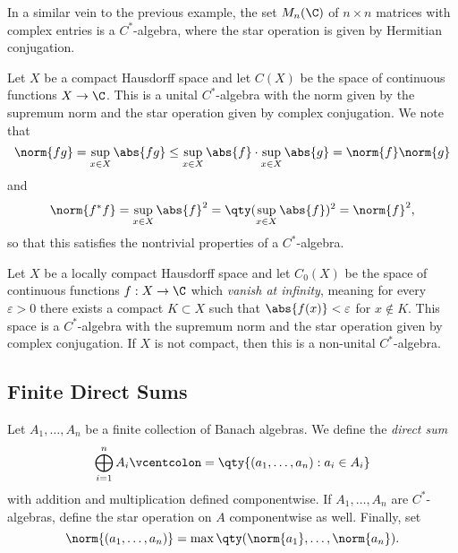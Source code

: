 \begin{example}
In a similar vein to the previous example, the set $M_{n}(\C)$ of $n \times n$ matrices with complex entries is a $C^*$-algebra, where the star operation is given by Hermitian conjugation.
\end{example}

\begin{example}
Let $X$ be a compact Hausdorff space and let $C(X)$ be the space of continuous functions $X \rightarrow \C$. This is a unital $C^*$-algebra with the norm given by the supremum norm and the star operation given by complex conjugation. We note that
\begin{equation}
\norm{fg} = \sup_{x \in X} \abs{fg} \leq \sup_{x \in X} \abs{f} \cdot \sup_{x \in X} \abs{g} = \norm{f} \norm{g}
\end{equation}
and 
\begin{equation}
\norm{f^*f} = \sup_{x \in X} \abs{f}^2  = \qty(\sup_{x \in X} \abs{f})^2 = \norm{f}^2,
\end{equation}
so that this satisfies the nontrivial properties of a $C^*$-algebra.
\end{example}


\begin{example}
Let $X$ be a locally compact Hausdorff space and let $C_0(X)$ be the space of continuous functions $f: X \rightarrow \C$ which \emph{vanish at infinity}, meaning for every $\varepsilon > 0$ there exists a compact $K \subset X$ such that $\abs{f(x)} < \varepsilon$ for $x \notin K$. This space is a $C^*$-algebra with the supremum norm and the star operation given by complex conjugation. If $X$ is not compact, then this is a non-unital $C^*$-algebra.
\end{example}


\subsection*{Finite Direct Sums}

Let $A_1,\ldots, A_n$ be a finite collection of Banach algebras. We define the \emph{direct sum}
\begin{equation}
\bigoplus_{i=1}^n A_i \defeq \qty{(a_1,\ldots, a_n): a_i \in A_i}
\end{equation}
with addition and multiplication defined componentwise. If $A_1,\ldots, A_n$ are $C^*$-algebras, define the star operation on $A$ componentwise as well. Finally, set
\begin{equation}
\norm{(a_1,\ldots, a_n)} = \max\qty(\norm{a_1},\ldots, \norm{a_n}).
\end{equation}


